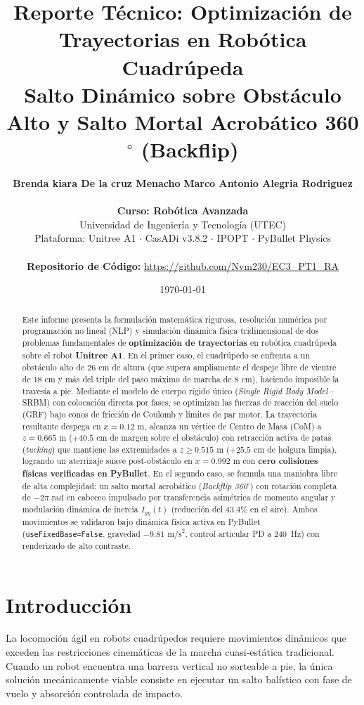 \documentclass[11pt,a4paper]{article}
\title{\textbf{\Large Reporte Técnico: Optimización de Trayectorias en Robótica Cuadrúpeda}\\
\large Salto Dinámico sobre Obstáculo Alto y Salto Mortal Acrobático 360$^\circ$ (Backflip)}
\author{
\textbf{Brenda kiara De la cruz Menacho} \qquad \textbf{Marco Antonio Alegria Rodriguez} \\
\vspace{0.15cm} \\
\textbf{Curso: Robótica Avanzada} \\
Universidad de Ingeniería y Tecnología (UTEC) \\
Plataforma: Unitree A1 $\cdot$ CasADi v3.8.2 $\cdot$ IPOPT $\cdot$ PyBullet Physics \\
\vspace{0.12cm} \\
\textbf{Repositorio de Código:} \url{https://github.com/Nvm230/EC3_PT1_RA}}
\date{\today}
\begin{document}
\maketitle

\begin{abstract}
Este informe presenta la formulación matemática rigurosa, resolución numérica por programación no lineal (NLP) y simulación dinámica física tridimensional de dos problemas fundamentales de \textbf{optimización de trayectorias} en robótica cuadrúpeda sobre el robot \textbf{Unitree A1}. En el primer caso, el cuadrúpedo se enfrenta a un obstáculo alto de $26\text{ cm}$ de altura (que supera ampliamente el despeje libre de vientre de $18\text{ cm}$ y más del triple del paso máximo de marcha de $8\text{ cm}$), haciendo imposible la travesía a pie. Mediante el modelo de cuerpo rígido único (\textit{Single Rigid Body Model} -- SRBM) con colocación directa por fases, se optimizan las fuerzas de reacción del suelo (GRF) bajo conos de fricción de Coulomb y límites de par motor. La trayectoria resultante despega en $x = 0.12\text{ m}$, alcanza un vértice de Centro de Masa (CoM) a $z = 0.665\text{ m}$ ($+40.5\text{ cm}$ de margen sobre el obstáculo) con retracción activa de patas (\textit{tucking}) que mantiene las extremidades a $z \ge 0.515\text{ m}$ ($+25.5\text{ cm}$ de holgura limpia), logrando un aterrizaje suave post-obstáculo en $x = 0.992\text{ m}$ con \textbf{cero colisiones físicas verificadas en PyBullet}. En el segundo caso, se formula una maniobra libre de alta complejidad: un salto mortal acrobático (\textit{Backflip 360$^\circ$}) con rotación completa de $-2\pi\text{ rad}$ en cabeceo impulsado por transferencia asimétrica de momento angular y modulación dinámica de inercia $I_{yy}(t)$ (reducción del $43.4\%$ en el aire). Ambos movimientos se validaron bajo dinámica física activa en PyBullet (\texttt{useFixedBase=False}, gravedad $-9.81\text{ m/s}^2$, control articular PD a 240~Hz) con renderizado de alto contraste.
\end{abstract}

\vspace{0.3cm}

\section{Introducción}
La locomoción ágil en robots cuadrúpedos requiere movimientos dinámicos que exceden las restricciones cinemáticas de la marcha cuasi-estática tradicional. Cuando un robot encuentra una barrera vertical no sorteable a pie, la única solución mecánicamente viable consiste en ejecutar un salto balístico con fase de vuelo y absorción controlada de impacto.
\end{document}
